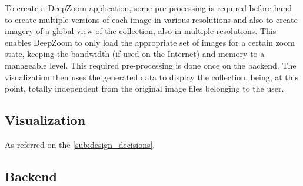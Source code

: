 To create a DeepZoom application, some pre-processing is required before hand to create multiple versions of each image in various resolutions and also to create imagery of a global view of the collection, also in multiple resolutions. This enables DeepZoom to only load the appropriate set of images for a certain zoom state, keeping the bandwidth (if used on the Internet) and memory  to a manageable level. This required pre-processing   is done once on the backend. The visualization then uses the generated data to display the collection, being, at this point, totally independent from the original image files belonging to the user.





\subsection{Visualization} %
\label{sub:visualization}

As referred on the \ref{sub:design_decisions}.







\subsection{Backend} %
\label{sub:backend}






